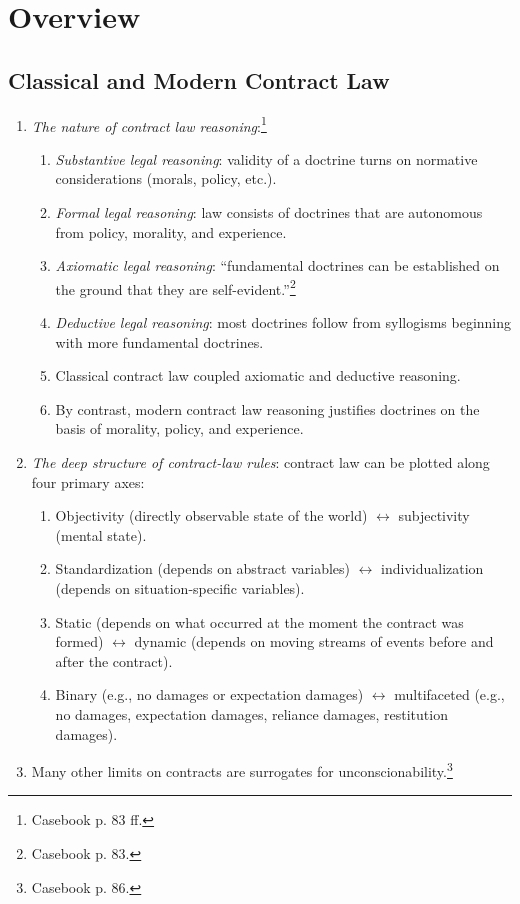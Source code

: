 \section{Overview}

\subsection{Classical and Modern Contract Law}

\begin{enumerate}
    \item \emph{The nature of contract law reasoning}:\footnote{Casebook p. 83 
    ff.}
    \begin{enumerate}
        \item \emph{Substantive legal reasoning}: validity of a doctrine turns 
        on normative considerations (morals, policy, etc.).
        \item \emph{Formal legal reasoning}: law consists of doctrines that 
        are autonomous from policy, morality, and experience.
        \item \emph{Axiomatic legal reasoning}: ``fundamental doctrines can be 
        established on the ground that they are 
        self-evident.''\footnote{Casebook p. 83.}
        \item \emph{Deductive legal reasoning}: most doctrines follow from 
        syllogisms beginning with more fundamental doctrines.
        \item Classical contract law coupled axiomatic and deductive 
        reasoning.
        \item By contrast, modern contract law reasoning justifies doctrines 
        on the basis of morality, policy, and experience.
    \end{enumerate}
    \item \emph{The deep structure of contract-law rules}: contract law can be 
    plotted along four primary axes:
    \begin{enumerate}
        \item Objectivity (directly observable state of the world) 
        $\leftrightarrow$ subjectivity (mental state).
        \item Standardization (depends on abstract variables) $\leftrightarrow$ 
        individualization (depends on situation-specific variables).
        \item Static (depends on what occurred at the moment the contract was 
        formed) $\leftrightarrow$ dynamic (depends on moving streams of events 
        before and after the contract).
        \item Binary (e.g., no damages or expectation damages) 
        $\leftrightarrow$ multifaceted (e.g., no damages, expectation damages, 
        reliance damages, restitution damages).
    \end{enumerate}
    \item Many other limits on contracts are surrogates for 
    unconscionability.\footnote{Casebook p. 86.}
\end{enumerate}

